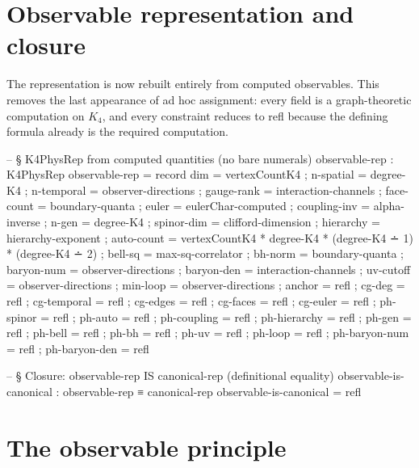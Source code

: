 \documentclass[11pt,a4paper]{book}
\def\texttt#1{#1}%
\begin{document}
\section{Observable representation and closure}

The representation is now rebuilt entirely from computed observables. This removes the last appearance of ad hoc assignment: every field is a graph-theoretic computation on $K_4$, and every constraint reduces to \texttt{refl} because the defining formula already is the required computation.

\begin{code}
  -- § K4PhysRep from computed quantities (no bare numerals)
  observable-rep : K4PhysRep
  observable-rep = record
    { dim          = vertexCountK4
    ; n-spatial    = degree-K4
    ; n-temporal   = observer-directions
    ; gauge-rank   = interaction-channels
    ; face-count   = boundary-quanta
    ; euler        = eulerChar-computed
    ; coupling-inv = alpha-inverse
    ; n-gen        = degree-K4
    ; spinor-dim   = clifford-dimension
    ; hierarchy    = hierarchy-exponent
    ; auto-count   = vertexCountK4 * degree-K4
                   * (degree-K4 ∸ 1) * (degree-K4 ∸ 2)
    ; bell-sq      = max-sq-correlator
    ; bh-norm      = boundary-quanta
    ; baryon-num   = observer-directions
    ; baryon-den   = interaction-channels
    ; uv-cutoff    = observer-directions
    ; min-loop     = observer-directions
    ; anchor       = refl
    ; cg-deg       = refl
    ; cg-temporal  = refl
    ; cg-edges     = refl
    ; cg-faces     = refl
    ; cg-euler     = refl
    ; ph-spinor    = refl
    ; ph-auto      = refl
    ; ph-coupling  = refl
    ; ph-hierarchy = refl
    ; ph-gen       = refl
    ; ph-bell      = refl
    ; ph-bh        = refl
    ; ph-uv        = refl
    ; ph-loop      = refl
    ; ph-baryon-num = refl
    ; ph-baryon-den = refl
    }

  -- § Closure: observable-rep IS canonical-rep (definitional equality)
  observable-is-canonical : observable-rep ≡ canonical-rep
  observable-is-canonical = refl
\end{code}


\section{The observable principle}
\end{document}
